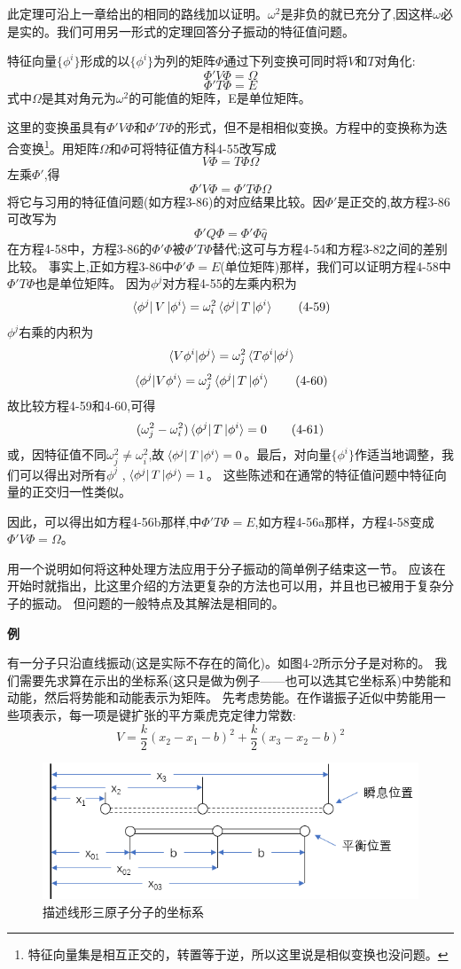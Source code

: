 此定理可沿上一章给出的相同的路线加以证明。$\omega^2$是非负的就已充分了,因这样$\omega$必是实的。我们可用另一形式的定理回答分子振动的特征值问题。
\begin{theorem}
特征向量$\{\phi^i\}$形成的以$\{\phi^i\}$为列的矩阵$\Phi$通过下列变换可同时将$V$和$T$对角化:
\[\Phi'V\Phi=\Omega \tag{4-56a}\]
\[\Phi'T\Phi=E \tag{4-56a}\]
式中$\Omega$是其对角元为$\omega^2$的可能值的矩阵，E是单位矩阵。
\end{theorem}

这里的变换虽具有$\Phi'V\Phi$和$\Phi'T\Phi$的形式，但不是相相似变换。方程中的变换称为迭合变换\footnote{特征向量集是相互正交的，转置等于逆，所以这里说是相似变换也没问题。}。用矩阵$\Omega$和$\Phi$可将特征值方科4-55改写成
\[V\Phi=T\Phi\Omega \tag{4-57}\]
左乘$\Phi'$,得
\[\Phi'V\Phi=\Phi'T\Phi\Omega \tag{4-58}\]
将它与习用的特征值问题(如方程3-86)的对应结果比较。因$\Phi'$是正交的,故方程3-86可改写为
\[\Phi'Q\Phi=\Phi'\Phi\hat{q} \tag{3-86}\]
在方程4-58中，方程3-86的$\Phi'\Phi$被$\Phi'T\Phi$替代;这可与方程4-54和方程3-82之间的差别比较。
事实上,正如方程3-86中$\Phi'\Phi=E$(单位矩阵)那样，我们可以证明方程4-58中$\Phi'T\Phi$也是单位矩阵。
因为$\phi^j$对方程4-55的左乘内积为
\[\bra*{\phi^j}V\ket*{\phi^i}=\omega_i^2\bra*{\phi^j}T\ket*{\phi^i} \tag{4-59}\]
$\phi^j$右乘的内积为
\[\bra*{V\phi^i}\ket*{\phi^j}=\omega^2_j\bra*{T\phi^i}\ket*{\phi^j}\]
\[\bra*{\phi^j}\ket*{V\phi^i}=\omega^2_j\bra*{\phi^j}T\ket*{\phi^i} \tag{4-60}\]
故比较方程4-59和4-60,可得
\[(\omega_j^2-\omega_i^2)\bra*{\phi^j}T\ket*{\phi^i}=0 \tag{4-61}\]
或，因特征值不同$\omega_j^2 \neq \omega_i^2$,故$\bra*{\phi^j}T\ket*{\phi^i}=0$。最后，对向量$\{\phi^i\}$作适当地调整，我们可以得出对所有$\phi^j$ ,$\bra*{\phi^j}T\ket*{\phi^j}=1$。
这些陈述和在通常的特征值问题中特征向量的正交归一性类似。

因此，可以得出如方程4-56b那样,中$\Phi'T\Phi=E$,如方程4-56a那样，方程4-58变成$\Phi'V\Phi=\Omega$。

用一个说明如何将这种处理方法应用于分子振动的简单例子结束这一节。
应该在开始时就指出，比这里介绍的方法更复杂的方法也可以用，并且也已被用于复杂分子的振动。
但问题的一般特点及其解法是相同的。

\textbf{例}

有一分子只沿直线振动(这是实际不存在的简化)。如图4-2所示分子是对称的。
我们需要先求算在示出的坐标系(这只是做为例子——也可以选其它坐标系)中势能和动能，然后将势能和动能表示为矩阵。
先考虑势能。在作谐振子近似中势能用一些项表示，每一项是键扩张的平方乘虎克定律力常数:
\[V=\frac{k}{2}(x_2-x_1-b)^2+\frac{k}{2}(x_3-x_2-b)^2\]

\begin{figure}[htbp]
    \centering
    \includegraphics[scale=0.5]{./fig/4-2.png}
    \caption{描述线形三原子分子的坐标系}
\end{figure}

